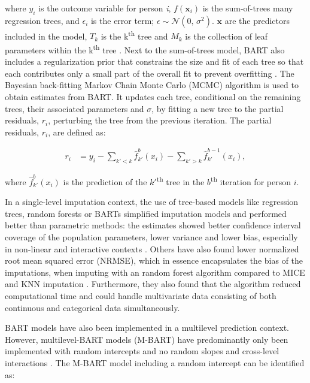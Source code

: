 \documentclass[10pt, a4paper, titlepage]{article}
\begin{document}
where $y_i$ is the outcome variable for person \textit{i}, $f(\textbf{x}_i)$ is the sum-of-trees many regression trees, and $\epsilon_i$ is the error term; $\epsilon \sim \mathcal{N}(0,\,\sigma^{2})$. $\textbf{x}$ are the predictors included in the model, $T_{k}$ is the k\textsuperscript{th} tree and $M_{k}$ is the collection of leaf parameters within the k\textsuperscript{th} tree \citep{chipman2010, hill2020, james2021}. Next to the sum-of-trees model, BART also includes a regularization prior that constrains the size and fit of each tree so that each contributes only a small part of the overall fit to prevent overfitting \citep{chipman2010, hill2020, james2021}. The Bayesian back-fitting Markov Chain Monte Carlo (MCMC) algorithm is used to obtain estimates from BART. It updates each tree, conditional on the remaining trees, their associated parameters and $\sigma$, by fitting a new tree to the partial residuals, $r_{i}$, perturbing the tree from the previous iteration. The partial residuals, $r_{i}$, are defined as:

\begin{subequations}
\label{eq:partialresiduals}
\begin{align}
r_i &= y_i - \sum_{k' < k} \hat{f}^{b}_{k'}(x_{i}) - \sum_{k' > k} \hat{f}^{b-1}_{k'}(x_{i}), \tag{2}
\end{align}
\end{subequations}

where $\hat{f}^{b}_{k'}(x_{i})$ is the prediction of the $k'$\textsuperscript{th} tree in the $b$\textsuperscript{th} iteration for person $i$.

In a single-level imputation context, the use of tree-based models like regression trees, random forests or BARTs simplified imputation models and performed better than parametric methods: the estimates showed better confidence interval coverage of the population parameters, lower variance and lower bias, especially in non-linear and interactive contexts \citep{burgette2010, xu2016, silva2022}. Others have also found lower normalized root mean squared error (NRMSE), which in essence encapsulates the bias of the imputations, when imputing with an random forest algorithm compared to MICE and KNN imputation \citep{stekhoven2012, waljee2013}. Furthermore, they also found that the algorithm reduced computational time and could handle multivariate data consisting of both continuous and categorical data simultaneously.

BART models have also been implemented in a multilevel prediction context. However, multilevel-BART models (M-BART) have predominantly only been implemented with random intercepts and no random slopes and cross-level interactions \citep{chen2020, wagner2020, tan2016, wundervald2022}. The M-BART model including a random intercept can be identified as:
\end{document}
